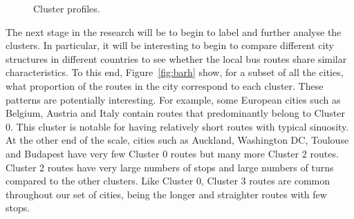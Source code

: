 \documentclass[11pt]{article}
\begin{document}
\begin{figure}[ht] \begin{center} 
 \caption{Cluster profiles.} \label{fig:cluster_profiles} \end{center} \end{figure} %

The next stage in the research will be to begin to label and further analyse the clusters. In particular, it will be interesting to begin to compare different city structures in different countries to see whether the local bus routes share similar characteristics. To this end, Figure~\ref{fig:barh} show, for a subset of all the cities, what proportion of the routes in the city correspond to each cluster. These patterns are potentially interesting. For example, some European cities such as Belgium, Austria and Italy contain routes that predominantly belong to Cluster 0. This cluster is notable for having relatively short routes with typical sinuosity. At the other end of the scale, cities such as Auckland, Washington DC, Toulouse and Budapest have very few Cluster 0 routes but many more Cluster 2 routes. Cluster 2 routes have very large numbers of stops and large numbers of turns compared to the other clusters. Like Cluster 0, Cluster 3 routes are common throughout our set of cities, being the longer and straighter routes with few stops. 
\end{document}
